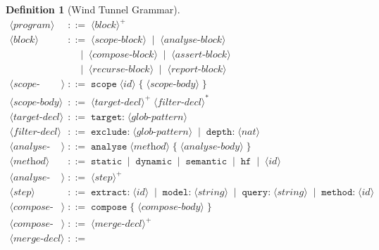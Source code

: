 \documentclass[12pt,a4paper,twocolumn]{article}
\theoremstyle{plain}
\theoremstyle{definition}
\newtheorem{definition}[theorem]{Definition}
\theoremstyle{remark}
\begin{document}
\begin{definition}[Wind Tunnel Grammar]
\label{def:grammar}
\begin{align*}
\langle\textit{program}\rangle &\;::=\; \langle\textit{block}\rangle^+ \\[4pt]
\langle\textit{block}\rangle &\;::=\;
  \langle\textit{scope-block}\rangle \;\mid\; \langle\textit{analyse-block}\rangle \\
  &\quad\;\mid\; \langle\textit{compose-block}\rangle \;\mid\;
    \langle\textit{assert-block}\rangle \\
  &\quad\;\mid\; \langle\textit{recurse-block}\rangle \;\mid\;
    \langle\textit{report-block}\rangle \\[4pt]
\langle\textit{scope-block}\rangle &\;::=\;
  \texttt{scope}\;\langle\textit{id}\rangle\;\texttt{\{}\;
  \langle\textit{scope-body}\rangle\;\texttt{\}} \\
\langle\textit{scope-body}\rangle &\;::=\;
  \langle\textit{target-decl}\rangle^+\;\langle\textit{filter-decl}\rangle^* \\
\langle\textit{target-decl}\rangle &\;::=\;
  \texttt{target:}\;\langle\textit{glob-pattern}\rangle \\
\langle\textit{filter-decl}\rangle &\;::=\;
  \texttt{exclude:}\;\langle\textit{glob-pattern}\rangle
  \;\mid\; \texttt{depth:}\;\langle\textit{nat}\rangle \\[4pt]
\langle\textit{analyse-block}\rangle &\;::=\;
  \texttt{analyse}\;\langle\textit{method}\rangle\;\texttt{\{}\;
  \langle\textit{analyse-body}\rangle\;\texttt{\}} \\
\langle\textit{method}\rangle &\;::=\;
  \texttt{static} \;\mid\; \texttt{dynamic} \;\mid\;
  \texttt{semantic} \;\mid\; \texttt{hf} \;\mid\; \langle\textit{id}\rangle \\
\langle\textit{analyse-body}\rangle &\;::=\;
  \langle\textit{step}\rangle^+ \\
\langle\textit{step}\rangle &\;::=\;
  \texttt{extract:}\;\langle\textit{id}\rangle
  \;\mid\; \texttt{model:}\;\langle\textit{string}\rangle
  \;\mid\; \texttt{query:}\;\langle\textit{string}\rangle
  \;\mid\; \texttt{method:}\;\langle\textit{id}\rangle \\[4pt]
\langle\textit{compose-block}\rangle &\;::=\;
  \texttt{compose}\;\texttt{\{}\;
  \langle\textit{compose-body}\rangle\;\texttt{\}} \\
\langle\textit{compose-body}\rangle &\;::=\;
  \langle\textit{merge-decl}\rangle^+ \\
\langle\textit{merge-decl}\rangle &\;::=\;

\end{align*}
\end{definition}
\end{document}

